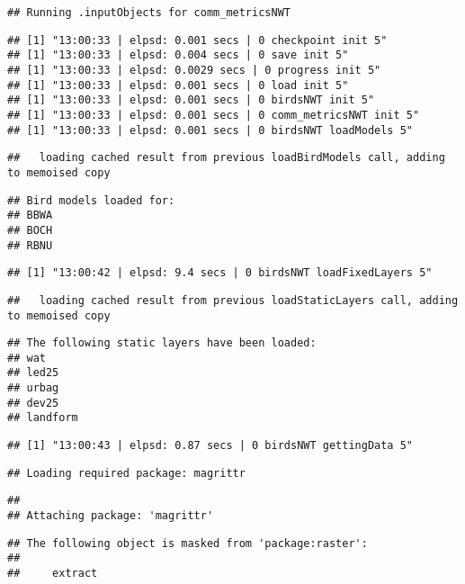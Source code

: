 \documentclass[]{article}
\begin{document}
\begin{verbatim}
## Running .inputObjects for comm_metricsNWT
\end{verbatim}

\begin{verbatim}
## [1] "13:00:33 | elpsd: 0.001 secs | 0 checkpoint init 5"
## [1] "13:00:33 | elpsd: 0.004 secs | 0 save init 5"
## [1] "13:00:33 | elpsd: 0.0029 secs | 0 progress init 5"
## [1] "13:00:33 | elpsd: 0.001 secs | 0 load init 5"
## [1] "13:00:33 | elpsd: 0.001 secs | 0 birdsNWT init 5"
## [1] "13:00:33 | elpsd: 0.001 secs | 0 comm_metricsNWT init 5"
## [1] "13:00:33 | elpsd: 0.001 secs | 0 birdsNWT loadModels 5"
\end{verbatim}

\begin{verbatim}
##   loading cached result from previous loadBirdModels call, adding to memoised copy
\end{verbatim}

\begin{verbatim}
## Bird models loaded for: 
## BBWA
## BOCH
## RBNU
\end{verbatim}

\begin{verbatim}
## [1] "13:00:42 | elpsd: 9.4 secs | 0 birdsNWT loadFixedLayers 5"
\end{verbatim}

\begin{verbatim}
##   loading cached result from previous loadStaticLayers call, adding to memoised copy
\end{verbatim}

\begin{verbatim}
## The following static layers have been loaded: 
## wat
## led25
## urbag
## dev25
## landform
\end{verbatim}

\begin{verbatim}
## [1] "13:00:43 | elpsd: 0.87 secs | 0 birdsNWT gettingData 5"
\end{verbatim}

\begin{verbatim}
## Loading required package: magrittr
\end{verbatim}

\begin{verbatim}
## 
## Attaching package: 'magrittr'
\end{verbatim}

\begin{verbatim}
## The following object is masked from 'package:raster':
## 
##     extract
\end{verbatim}
\end{document}
